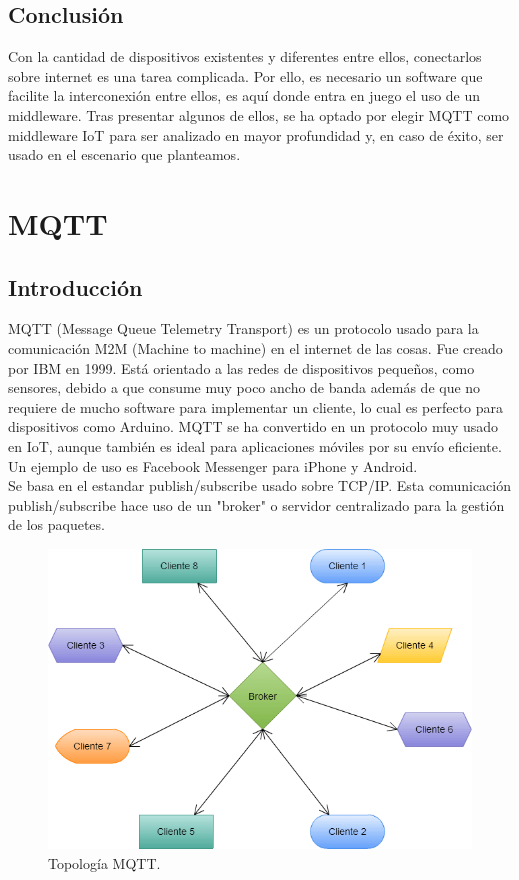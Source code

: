 \documentclass[12pt, twoside]{book}
\begin{document}
\section{Conclusión}
Con la cantidad de dispositivos existentes y diferentes entre ellos, conectarlos sobre internet es una tarea complicada. Por ello, es necesario un software que facilite la interconexión entre ellos, es aquí donde entra en juego el uso de un middleware. Tras presentar algunos de ellos, se ha optado por elegir MQTT como middleware IoT para ser analizado en mayor profundidad y, en caso de éxito, ser usado en el escenario que planteamos.
\chapter{MQTT}
\section{Introducción}
MQTT (Message Queue Telemetry Transport) es un protocolo usado para la comunicación M2M (Machine to machine) en el internet de las cosas. Fue creado por IBM en 1999. Está orientado a las redes de dispositivos pequeños, como sensores, debido a que consume muy poco ancho de banda además de que no requiere de mucho software para implementar un cliente, lo cual es perfecto para dispositivos como Arduino. MQTT se ha convertido en un protocolo muy usado en IoT, aunque también es ideal para aplicaciones móviles por su envío eficiente. Un ejemplo de uso es Facebook Messenger para iPhone y Android.\\
Se basa en el estandar publish/subscribe usado sobre TCP/IP. Esta comunicación publish/subscribe hace uso de un "broker" o servidor centralizado para la gestión de los paquetes.
\begin{figure}[h!]
\centering
\includegraphics[scale=0.3]{images/topologia.png}
\caption{Topología MQTT.}\label{L401}
\end{figure}
\end{document}
